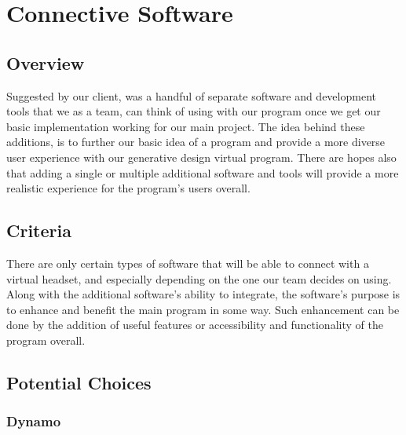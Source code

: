 \documentclass[letterpaper,10pt,onecolumn,compsoc]{IEEEtran}
\begin{document}
\newpage

\section{Connective Software}
\subsection{Overview}

\noindent
Suggested by our client, was a handful of separate software and development tools that we as a team, can think of using with our program once we get our basic implementation working for our main project. The idea behind these additions, is to further our basic idea of a program and provide a more diverse user experience with our generative design virtual program. There are hopes also that adding a single or multiple additional software and tools will provide a more realistic experience for the program's users overall.

\subsection{Criteria}


\noindent
There are only certain types of software that will be able to connect with a virtual headset, and especially depending on the one our team decides on using. Along with the additional software's ability to integrate, the software's purpose is to enhance and benefit the main program in some way. Such enhancement can be done by the addition of useful features or accessibility and functionality of the program overall.

\subsection{Potential Choices}
\subsubsection{Dynamo}
\end{document}
